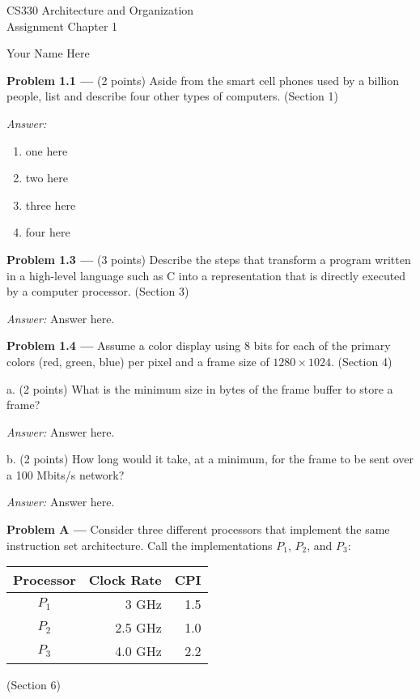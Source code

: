 \documentclass[11pt]{article}
\newcommand{\problem}[1]{\textbf{Problem #1 ---} }
\newcommand{\answer}{{\color{red}\textit{Answer: }}}
\begin{document}
\thispagestyle{empty}

\begin{center}
{\large CS330 Architecture and Organization}\\
Assignment Chapter 1
\end{center}

\begin{flushright}
Your Name Here %
\end{flushright}

\problem{1.1}(2 points) Aside from the smart cell phones used by a billion people, list and describe four other types of computers. (Section 1)

\answer 
\begin{enumerate}
    \item one here
    \item two here
    \item three here
    \item four here
\end{enumerate}

\problem{1.3}(3 points) Describe the steps that transform a program written in a high-level language such as C into a representation that is directly executed by a computer processor. (Section 3)

\answer
Answer here.

\problem{1.4} Assume a color display using 8 bits for each of the primary colors (red, green, blue) per pixel and a frame size of $1280 \times 1024$. (Section 4)

a. (2 points) What is the minimum size in bytes of the frame buffer to store a frame?

\answer
Answer here.

b. (2 points) How long would it take, at a minimum, for the frame to be sent over a 100 Mbits/s network?

\answer
Answer here.

\problem{A} Consider three different processors that implement the same instruction set architecture.  Call the implementations $P_{1}$, $P_{2}$, and $P_{3}$:

\begin{center}
\begin{tabular}{c|r|r}
\textbf{Processor} & \textbf{Clock Rate} & \textbf{CPI} \\ \hline \hline
$P_{1}$ & 3 GHz & 1.5 \\ \hline
$P_{2}$ & 2.5 GHz & 1.0 \\ \hline
$P_{3}$ & 4.0 GHz & 2.2 \\
\end{tabular}
\end{center}
(Section 6)
\end{document}
